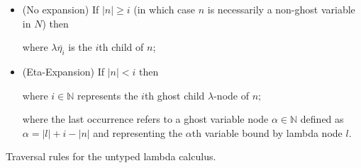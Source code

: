 \documentclass{article}
\theoremstyle{definition}
\newcommand\Nodes{N}%
\begin{document}
\begin{FramedTable}
\begin{itemize}[]
\begin{itemize}
  \item (No expansion) If $|n|\geq i$ (in which case $n$ is necessarily a non-ghost variable in $\Nodes$) then

   where $\lambda \overline{\eta_i}$ is the $i$th child of $n$;

\item (Eta-Expansion) If $|n| < i$ then

   where $i \in \mathbb{N}$ represents the $i$th ghost child $\lambda$-node of $n$;



     where the last occurrence refers to a ghost variable node $\alpha \in \mathbb{N}$ defined as $\alpha = |l| + i - |n|$ and representing the $\alpha$th variable bound by lambda node $l$.
\end{itemize}

\end{itemize}
\caption{Traversal rules for the untyped lambda calculus.}
 \label{tab:trav_rules}
\end{FramedTable}




\end{document}
